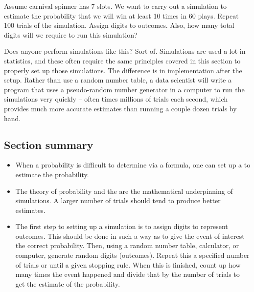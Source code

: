 \begin{exercisewrap}
\begin{nexercise}Assume carnival spinner has 7 slots. We want to carry out a simulation to estimate the probability that we will win at least 10 times in 60 plays. Repeat 100 trials of the simulation. Assign digits to outcomes. Also, how many total digits will we require to run this simulation?\footnotemark
\end{nexercise}
\end{exercisewrap}

Does anyone perform simulations like this? Sort of. Simulations are used a lot in statistics, and these often require the same principles covered in this section to properly set up those simulations. The difference is in implementation after the setup. Rather than use a random number table, a data scientist will write a program that uses a pseudo-random number generator in a computer to run the simulations very quickly -- often times millions of trials each second, which provides much more accurate estimates than running a couple dozen trials by hand.




\subsection*{Section summary}

\begin{itemize}
\item When a probability is difficult to determine via a formula, one can set up a  to estimate the probability.

\item The  theory of probability and the  are the mathematical underpinning of simulations.  A larger number of trials should tend to produce better estimates.  

\item The first step to setting up a simulation is to assign digits to represent outcomes.  This should be done in such a way as to give the event of interest the correct probability.  Then, using a random number table, calculator, or computer, generate random digits (outcomes). Repeat this a specified number of trials or until a given stopping rule.  When this is finished, count up how many times the event happened and divide that by the number of trials to get the estimate of the probability.

\end{itemize}


